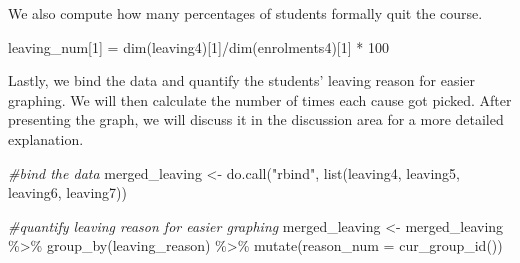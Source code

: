 \documentclass[12pt,]{article}
\newenvironment{Shaded}{\begin{snugshade}}{\end{snugshade}}
\newcommand{\AttributeTok}[1]{\textcolor[rgb]{0.77,0.63,0.00}{#1}}
\newcommand{\CommentTok}[1]{\textcolor[rgb]{0.56,0.35,0.01}{\textit{#1}}}
\newcommand{\DecValTok}[1]{\textcolor[rgb]{0.00,0.00,0.81}{#1}}
\newcommand{\FunctionTok}[1]{\textcolor[rgb]{0.00,0.00,0.00}{#1}}
\newcommand{\NormalTok}[1]{#1}
\newcommand{\OtherTok}[1]{\textcolor[rgb]{0.56,0.35,0.01}{#1}}
\newcommand{\SpecialCharTok}[1]{\textcolor[rgb]{0.00,0.00,0.00}{#1}}
\newcommand{\StringTok}[1]{\textcolor[rgb]{0.31,0.60,0.02}{#1}}
\begin{document}
\begin{Shaded}
\end{Shaded}

We also compute how many percentages of students formally quit the
course.

\begin{Shaded}
\begin{Highlighting}[]
\NormalTok{leaving\_num[}\DecValTok{1}\NormalTok{] }\OtherTok{=} \FunctionTok{dim}\NormalTok{(leaving4)[}\DecValTok{1}\NormalTok{]}\SpecialCharTok{/}\FunctionTok{dim}\NormalTok{(enrolments4)[}\DecValTok{1}\NormalTok{] }\SpecialCharTok{*} \DecValTok{100}
\end{Highlighting}
\end{Shaded}

Lastly, we bind the data and quantify the students' leaving reason for
easier graphing. We will then calculate the number of times each cause
got picked. After presenting the graph, we will discuss it in the
discussion area for a more detailed explanation.

\begin{Shaded}
\begin{Highlighting}[]
\CommentTok{\#bind the data}
\NormalTok{merged\_leaving }\OtherTok{\textless{}{-}} \FunctionTok{do.call}\NormalTok{(}\StringTok{"rbind"}\NormalTok{, }\FunctionTok{list}\NormalTok{(leaving4, leaving5, }
\NormalTok{                                        leaving6, leaving7))}

\CommentTok{\#quantify leaving reason for easier graphing}
\NormalTok{merged\_leaving }\OtherTok{\textless{}{-}}\NormalTok{ merged\_leaving }\SpecialCharTok{\%\textgreater{}\%}
  \FunctionTok{group\_by}\NormalTok{(leaving\_reason) }\SpecialCharTok{\%\textgreater{}\%}
  \FunctionTok{mutate}\NormalTok{(}\AttributeTok{reason\_num =} \FunctionTok{cur\_group\_id}\NormalTok{())}
\end{Highlighting}
\end{Shaded}
\end{document}
